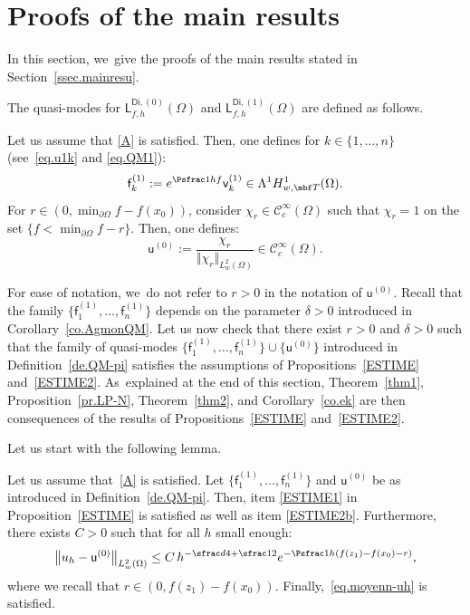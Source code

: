\section{Proofs of the main results}\label{sec.mainresu}
In this section, we~give the proofs of the main results stated in Section~\ref{ssec.mainresu}.

\label{sec.proof0}

The quasi-modes for $\mathsf L^{\mathsf{Di},(0)}_{f,h}(\Omega)$ and $\mathsf L^{\mathsf{Di},(1)}_{f,h}(\Omega)$ are defined as follows.

\begin{definition}\label{de.QM-pi}
Let us assume that \ref{A} is satisfied. Then, one defines for $k\in\{1,\ldots,n\}$
(see~\eqref{eq.u1k} and \eqref{eq.QM1}):
\[
\mathsf f_k^{(1)}:= e^{\Psfrac 1h f} \mathsf v_k^{(1)} \in \Lambda^1H^1_{w,\mbf T}(\Omega).
\]
For $r\in (0,\min_{\partial \Omega}f- f(x_0))$, consider $\chi_r\in \mathcal C^\infty_c(\Omega)$ such that $\chi_r=1$ on the set $\{f<\min_{\partial \Omega}f-r\}$. Then, one defines:
\[
\mathsf u^{(0)}:= \frac{\chi_r}{\Vert \chi_r\Vert_{L^2_w(\Omega)}}
\in \mathcal C^\infty_c (\Omega).
\]
\end{definition}

For ease of notation, we~do not refer to $r>0$ in the notation of $
\mathsf u^{(0)}$. Recall that the family $\{\mathsf f_1^{(1)},
\ldots, \mathsf f_n^{(1)}\} $ depends on the parameter $\delta >0$
introduced in Corollary~\ref{co.AgmonQM}.
Let us now check that there exist $r>0$ and $\delta >0$ such that the family of quasi-modes $\{\mathsf f_1^{(1)}, \ldots, \mathsf f_n^{(1)}\} \cup \{ \mathsf u^{(0)} \}$ introduced in Definition~\ref{de.QM-pi} satisfies the assumptions of Propositions~\ref{ESTIME} and~\ref{ESTIME2}. As~explained at the end of this section, Theorem~\ref{thm1}, Proposition~\ref{pr.LP-N}, Theorem~\ref{thm2}, and Corollary~\ref{co.ek} are then consequences of the results of Propositions~\ref{ESTIME} and~\ref{ESTIME2}.

Let us start with the following lemma.
\begin{lemma}\label{de1}
Let us assume that~\ref{A} is satisfied. Let $\{\mathsf f_1^{(1)}, \ldots, \mathsf f_n^{(1)}\} $ and $\mathsf u^{(0)}$ be as introduced in Definition~\ref{de.QM-pi}.
Then, item \eqref{ESTIME1} in Proposition~\ref{ESTIME} is satisfied as well as item \eqref{ESTIME2b}. Furthermore, there exists $C>0$ such that for all $h$ small enough:
\begin{equation}\label{eq.QM0-}
\big \Vert u_h - \mathsf u^{(0)}\big \Vert_{ L_w^2(\Omega)} \le C \, h^{-\sfrac d4 +\sfrac 12} e^{-\Psfrac 1h (f(z_1)-f(x_0)-r)},
\end{equation}
where we recall that $r\in (0,f(z_1)- f(x_0))$.
Finally,~\eqref{eq.moyenn-uh} is satisfied.
\end{lemma}

